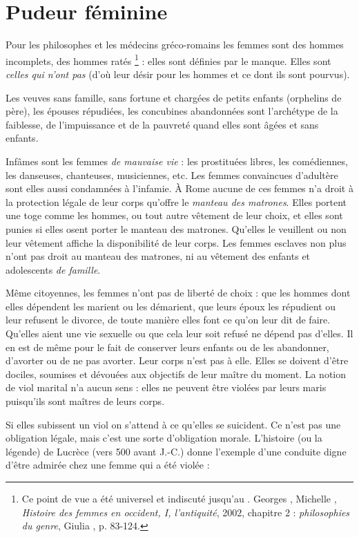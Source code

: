 \section{Pudeur féminine}

 Pour les philosophes et les médecins gréco-romains les femmes sont des hommes incomplets, des hommes ratés%
\footnote{Ce point de vue a été universel et indiscuté jusqu'au . Georges , Michelle , \emph{Histoire des femmes en occident, I, l'antiquité}, 2002, chapitre 2 : \emph{philosophies du genre}, Giulia , p. 83-124.}%
 : elles sont définies par le manque. Elles sont \emph{celles qui n'ont pas} (d'où leur désir pour les hommes et ce dont ils sont pourvus).

 Les veuves sans famille, sans fortune et chargées de petits enfants (orphelins de père), les épouses répudiées, les concubines abandonnées sont l'archétype de la faiblesse, de l'impuissance et de la pauvreté quand elles sont âgées et sans enfants. 

 Infâmes sont les femmes \emph{de mauvaise vie} : les prostituées libres, les comédiennes, les danseuses, chanteuses, musiciennes, etc. Les femmes convaincues d'adultère sont elles aussi condamnées à l'infamie. À Rome aucune de ces femmes n'a droit à la protection légale de leur corps qu'offre le \emph{manteau des matrones}. Elles portent une toge comme les hommes, ou tout autre vêtement de leur choix, et elles sont punies si elles osent porter le manteau des matrones. Qu'elles le veuillent ou non leur vêtement affiche la disponibilité de leur corps. Les femmes esclaves non plus n'ont pas droit au manteau des matrones, ni au vêtement des enfants et adolescents \emph{de famille}.

 Même citoyennes, les femmes n'ont pas de liberté de choix : que les hommes dont elles dépendent les marient ou les démarient, que leurs époux les répudient ou leur refusent le divorce, de toute manière elles font ce qu'on leur dit de faire. Qu'elles aient une vie sexuelle ou que cela leur soit refusé ne dépend pas d'elles. Il en est de même pour le fait de conserver leurs enfants ou de les abandonner, d'avorter ou de ne pas avorter. Leur corps n'est pas à elle. Elles se doivent d'être dociles, soumises et dévouées aux objectifs de leur maître du moment. La notion de viol marital n'a aucun sens : elles ne peuvent être violées par leurs maris puisqu'ils sont maîtres de leurs corps.

 Si elles subissent un viol on s'attend à ce qu'elles se suicident. Ce n'est pas une obligation légale, mais c'est une sorte d'obligation morale. L'histoire (ou la légende) de Lucrèce (vers 500 avant J.-C.) donne l'exemple d'une conduite digne d'être admirée chez une femme qui a été violée :

